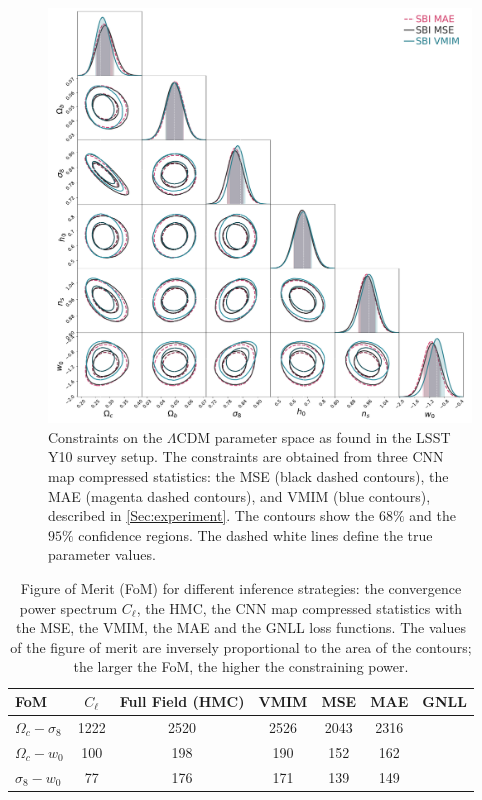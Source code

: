 \documentclass{aa}
\begin{document}
\begin{figure}
    \centering
        \includegraphics[width=\textwidth]{figures/contours_posterior_loss_dashed.pdf}
        \caption{
        Constraints on the $\Lambda$CDM parameter space as found in the LSST Y10 survey setup. The constraints are obtained from three CNN map compressed statistics: the MSE (black dashed contours), the MAE (magenta dashed contours), and VMIM (blue contours), described in \autoref{Sec:experiment}.
        The contours show the $68\%$ and the $95\%$  confidence regions. The dashed white lines define the true parameter values.}
        \label{fig:contours_posterior_diff_loss}
\end{figure}
\begin{table}
    \begin{center}
        \begin{tabular}{lcccccc} 
            \hline
            FoM & $C_{\ell}$ & Full Field (HMC)&  VMIM & MSE & MAE & GNLL   \\
            \hline\hline
            $\Omega_c-  \sigma_8$ & 1222 & 2520 & 2526 & 2043 & 2316\\
            $\Omega_c-  w_0$      & 100  & 198  & 190  & 152  & 162\\
            $\sigma_8-  w_0$      & 77   & 176  & 171  & 139  & 149\\
            \hline
        \end{tabular}
        \caption{ Figure of Merit (FoM) for different inference strategies: the convergence power spectrum $C_{\ell}$, the HMC, the CNN map compressed statistics with the MSE, the VMIM, the MAE and the GNLL loss functions. The values of the figure of merit are inversely proportional to the area of the contours; the larger the FoM, the higher the constraining power.}
        \label{tab:f_o_m}
    \end{center}
\end{table}
\end{document}
